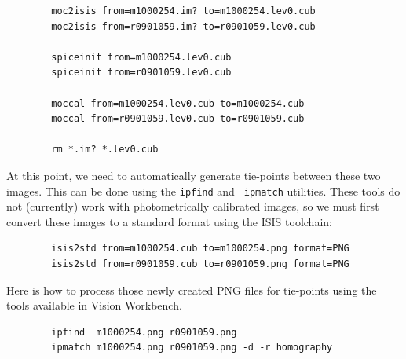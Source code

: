 \begin{verbatim}
        moc2isis from=m1000254.im? to=m1000254.lev0.cub
        moc2isis from=r0901059.im? to=r0901059.lev0.cub

        spiceinit from=m1000254.lev0.cub
        spiceinit from=r0901059.lev0.cub

        moccal from=m1000254.lev0.cub to=m1000254.cub
        moccal from=r0901059.lev0.cub to=r0901059.cub

        rm *.im? *.lev0.cub
\end{verbatim}

At this point, we need to automatically generate tie-points between
these two images.  This can be done using the {\tt ipfind} and {\tt
  ipmatch} utilities.  These tools do not (currently) work with
photometrically calibrated images, so we must first convert these
images to a standard format using the ISIS toolchain:

\begin{verbatim}
        isis2std from=m1000254.cub to=m1000254.png format=PNG
        isis2std from=r0901059.cub to=r0901059.png format=PNG
\end{verbatim}

Here is how to process those newly created PNG files for tie-points
using the tools available in Vision Workbench.

\begin{verbatim}
        ipfind  m1000254.png r0901059.png
        ipmatch m1000254.png r0901059.png -d -r homography
\end{verbatim}

\begin{center}
\end{center}

